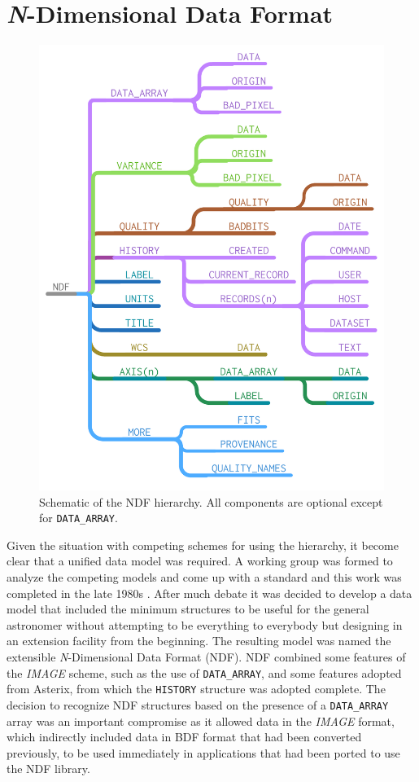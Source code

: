 \documentclass[final,authoryear,5p,times,twocolumn]{elsarticle}
\begin{document}
\section{\emph{N}-Dimensional Data Format}
\label{sec:ndf}

\begin{figure}[t]
\includegraphics[width=\columnwidth]{NDF-structure}
\caption{Schematic of the NDF hierarchy. All components are optional
  except for \texttt{DATA\_ARRAY}.}
\label{fig:ndf-structure}
\end{figure}

Given the situation with competing schemes for using the hierarchy, it
become clear that a unified data model was required. A working group
was formed to analyze the competing models and come up with a standard and this work
was completed in the late 1980s \citep{1988STARB...2...11C,SGP38}.
After much debate it was decided to develop a data model that included
the minimum structures to be useful for the general astronomer without
attempting to be everything to everybody but designing in an extension
facility from the beginning. The resulting model was named the
extensible \emph{N}-Dimensional Data Format (NDF).  NDF combined some
features of the \emph{IMAGE} scheme, such as the use of
\texttt{DATA\_ARRAY}, and some features adopted from Asterix, from
which the \texttt{HISTORY} structure was adopted complete.  The
decision to recognize NDF structures based on the presence of a
\texttt{DATA\_ARRAY} array was an important compromise as it allowed
data in the \emph{IMAGE} format, which indirectly included data in
BDF format that had been converted previously, to be used immediately
in applications that had been ported to use the NDF library.
\end{document}
